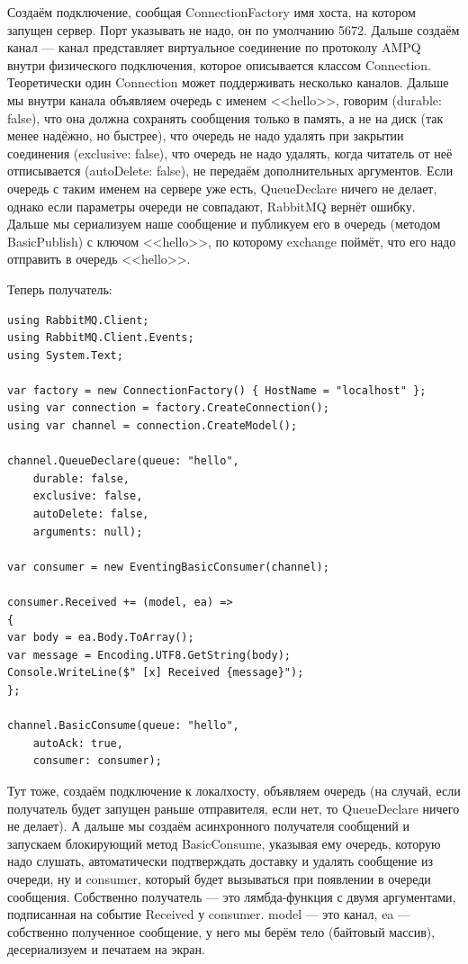 \documentclass{../../text-style}
\begin{document}
Создаём подключение, сообщая ConnectionFactory имя хоста, на котором запущен сервер. Порт указывать не надо, он по умолчанию 5672. Дальше создаём канал --- канал представляет виртуальное соединение по протоколу AMPQ внутри физического подключения, которое описывается классом Connection. Теоретически один Connection может поддерживать несколько каналов. Дальше мы внутри канала объявляем очередь с именем <<hello>>, говорим (durable: false), что она должна сохранять сообщения только в память, а не на диск (так менее надёжно, но быстрее), что очередь не надо удалять при закрытии соединения (exclusive: false), что очередь не надо удалять, когда читатель от неё отписывается (autoDelete: false), не передаём дополнительных аргументов. Если очередь с таким именем на сервере уже есть, QueueDeclare ничего не делает, однако если параметры очереди не совпадают, RabbitMQ вернёт ошибку. Дальше мы сериализуем наше сообщение и публикуем его в очередь (методом BasicPublish) с ключом <<hello>>, по которому exchange поймёт, что его надо отправить в очередь <<hello>>.

Теперь получатель:

\begin{verbatim}
using RabbitMQ.Client;
using RabbitMQ.Client.Events;
using System.Text;

var factory = new ConnectionFactory() { HostName = "localhost" };
using var connection = factory.CreateConnection();
using var channel = connection.CreateModel();

channel.QueueDeclare(queue: "hello",
    durable: false,
    exclusive: false,
    autoDelete: false,
    arguments: null);

var consumer = new EventingBasicConsumer(channel);

consumer.Received += (model, ea) =>
{
var body = ea.Body.ToArray();
var message = Encoding.UTF8.GetString(body);
Console.WriteLine($" [x] Received {message}");
};

channel.BasicConsume(queue: "hello",
    autoAck: true,
    consumer: consumer);
\end{verbatim}

Тут тоже, создаём подключение к локалхосту, объявляем очередь (на случай, если получатель будет запущен раньше отправителя, если нет, то QueueDeclare ничего не делает). А дальше мы создаём асинхронного получателя сообщений и запускаем блокирующий метод BasicConsume, указывая ему очередь, которую надо слушать, автоматически подтверждать доставку и удалять сообщение из очереди, ну и consumer, который будет вызываться при появлении в очереди сообщения. Собственно получатель --- это лямбда-функция с двумя аргументами, подписанная на событие Received у consumer. model --- это канал, ea --- собственно полученное сообщение, у него мы берём тело (байтовый массив), десериализуем и печатаем на экран.
\end{document}
